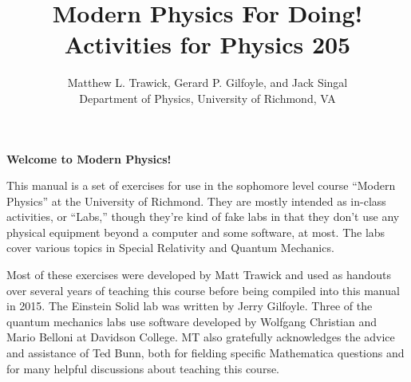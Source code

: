 

\title{Modern Physics For Doing!\\
Activities for Physics 205}

\author{Matthew L. Trawick, Gerard P. Gilfoyle, and Jack Singal\\
[4pt]
Department of Physics, University of Richmond, VA \\[4pt]
}

\maketitle

\vspace{0.8 in}


\begin{center}
\large{\textbf{Welcome to Modern Physics!}}
\end{center}


This manual is a set of exercises for use in the sophomore level course ``Modern Physics'' at the University of Richmond.  They are mostly intended as in-class activities, or ``Labs,'' though they’re kind of fake labs in that they don't use any physical equipment beyond a computer and some software, at most.  The labs cover various topics in Special Relativity and Quantum Mechanics.

Most of these exercises were developed by Matt Trawick and used as handouts over several years of teaching this course before being compiled into this manual in 2015.  The Einstein Solid lab was written by Jerry Gilfoyle.  Three of the quantum mechanics labs use software developed by Wolfgang Christian and Mario Belloni at Davidson College.  MT also gratefully acknowledges the advice and assistance of Ted Bunn, both for fielding specific Mathematica questions and for many helpful discussions about teaching this course.



\newpage
\
\thispagestyle{plain}

\newpage
\
